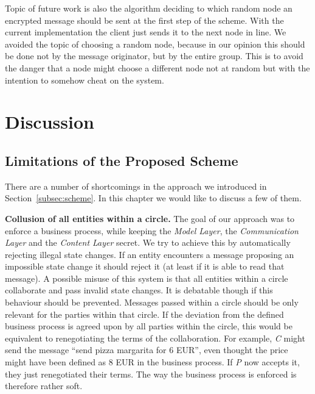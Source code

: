 \documentclass[runningheads]{llncs}
\newcommand{\comment}[1]{}
\newcommand{\ber}[1]{\textit{#1}}
\newcommand{\refsec}[1]{Section~\ref{#1}}
\renewcommand{\bigbreak}{}
\newcommand{\quotel}{``}
\newcommand{\quoter}{''}
\begin{document}
Topic of future work is also the algorithm deciding to which random node an encrypted message should be sent at the first step of the scheme. With the current implementation the client just sends it to the next node in line. We avoided the topic of choosing a random node, because in our opinion this should be done not by the message originator, but by the entire group. This is to avoid the danger that a node might choose a different node not at random but with the intention to somehow cheat on the system.


\comment{
done: 
simple implementation 
simulating a simple ring with 3 clients 
2 clients are within the same circle 
smart contract has public and is able to verify messages send from the ring

Not done: 
randomization. A client will not send the message of to a new node, rather just to the next one in line

Automatic accept/reject of messages send from node to node. User has to do that at current time.

architecture: 
Clients implemented in Python 3.6

smart contract implemented using Solidity

Application was tested using the local Ethereum application Ganache

}


\section{Discussion} \label{sec:discussion}

\subsection{Limitations of the Proposed Scheme}

There are a number of shortcomings in the approach we introduced in \refsec{subsec:scheme}. In this chapter we would like to discuss a few of them.



\bigbreak
\textbf{Collusion of all entities within a circle.} The goal of our approach was to enforce a business process, while keeping the \ber{Model Layer}, the \ber{Communication Layer} and the \ber{Content Layer} secret. We try to achieve this by automatically rejecting illegal state changes. If an entity encounters a message proposing an impossible state change it should reject it (at least if it is able to read that message). A possible misuse of this system is that all entities within a circle collaborate and pass invalid state changes. It is debatable though if this behaviour should be prevented. Messages passed within a circle should be only relevant for the parties within that circle. If the deviation from the defined business process is agreed upon by all parties within the circle, this would be equivalent to renegotiating the terms of the collaboration. For example, \ber{C} might send the message \quotel send pizza margarita for 6 EUR\quoter , even thought the price might have been defined as 8 EUR in the business process. If \ber{P} now accepts it, they just renegotiated their terms. The way the business process is enforced is therefore rather soft. 
\end{document}
